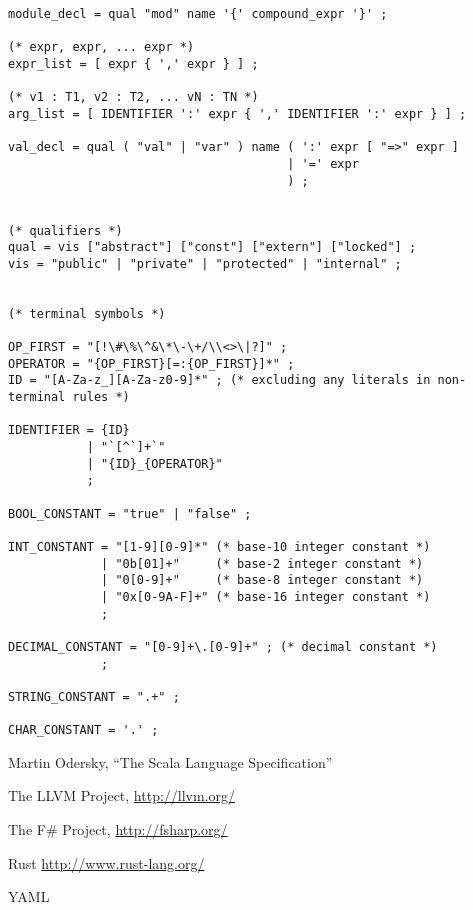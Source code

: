 \documentclass[journal]{IEEEtran}
\begin{document}
\begin{appendices}
{\begin{verbatim}
module_decl = qual "mod" name '{' compound_expr '}' ;

(* expr, expr, ... expr *)
expr_list = [ expr { ',' expr } ] ;

(* v1 : T1, v2 : T2, ... vN : TN *)
arg_list = [ IDENTIFIER ':' expr { ',' IDENTIFIER ':' expr } ] ;

val_decl = qual ( "val" | "var" ) name ( ':' expr [ "=>" expr ]
                                       | '=' expr
                                       ) ;


(* qualifiers *)
qual = vis ["abstract"] ["const"] ["extern"] ["locked"] ;
vis = "public" | "private" | "protected" | "internal" ;


(* terminal symbols *)

OP_FIRST = "[!\#\%\^&\*\-\+/\\<>\|?]" ;
OPERATOR = "{OP_FIRST}[=:{OP_FIRST}]*" ;
ID = "[A-Za-z_][A-Za-z0-9]*" ; (* excluding any literals in non-terminal rules *)

IDENTIFIER = {ID}
           | "`[^`]+`"
           | "{ID}_{OPERATOR}"
           ;

BOOL_CONSTANT = "true" | "false" ;

INT_CONSTANT = "[1-9][0-9]*" (* base-10 integer constant *)
             | "0b[01]+"     (* base-2 integer constant *)
             | "0[0-9]+"     (* base-8 integer constant *)
             | "0x[0-9A-F]+" (* base-16 integer constant *)
             ;

DECIMAL_CONSTANT = "[0-9]+\.[0-9]+" ; (* decimal constant *)
             ;

STRING_CONSTANT = ".+" ;

CHAR_CONSTANT = '.' ;
\end{verbatim}
}

\end{appendices}

\newpage

\begin{thebibliography}{9}

Martin Odersky, 
``The Scala Language Specification''

The LLVM Project,
\url{http://llvm.org/}

The F\# Project,
\url{http://fsharp.org/}

Rust
\url{http://www.rust-lang.org/}

YAML


\end{thebibliography}
\end{document}
